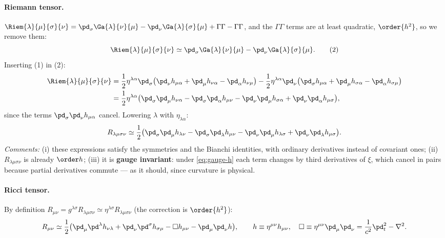 \paragraph{Riemann tensor.} $\Riem{\lambda}{\mu}{\sigma}{\nu}=\pd_\sigma\Ga{\lambda}{\nu}{\mu}-\pd_\nu\Ga{\lambda}{\sigma}{\mu}+\Gamma\Gamma-\Gamma\Gamma$, and the $\Gamma\Gamma$ terms are at least quadratic, $\order{h^2}$, so we remove them:
\begin{equation}
  \Riem{\lambda}{\mu}{\sigma}{\nu}\simeq\pd_\sigma\Ga{\lambda}{\nu}{\mu}-\pd_\nu\Ga{\lambda}{\sigma}{\mu}.\tag{2}
\end{equation}
Inserting (1) in (2):
\begin{align*}
  \Riem{\lambda}{\mu}{\sigma}{\nu}&=\frac12\eta^{\lambda\alpha}\pd_\sigma\big(\pd_\nu h_{\mu\alpha}+\pd_\mu h_{\nu\alpha}-\pd_\alpha h_{\nu\mu}\big)-\frac12\eta^{\lambda\alpha}\pd_\nu\big(\pd_\sigma h_{\mu\alpha}+\pd_\mu h_{\sigma\alpha}-\pd_\alpha h_{\sigma\mu}\big)\\
  &=\frac12\eta^{\lambda\alpha}\big(\pd_\sigma\pd_\mu h_{\nu\alpha}-\pd_\sigma\pd_\alpha h_{\mu\nu}-\pd_\nu\pd_\mu h_{\sigma\alpha}+\pd_\nu\pd_\alpha h_{\mu\sigma}\big),
\end{align*}
since the terms $\pd_\sigma\pd_\nu h_{\mu\alpha}$ cancel. Lowering $\lambda$ with $\eta_{\lambda\alpha}$:
\begin{equation}
  R_{\lambda\mu\sigma\nu}\simeq\frac12\big(\pd_\sigma\pd_\mu h_{\lambda\nu}-\pd_\sigma\pd_\lambda h_{\mu\nu}-\pd_\nu\pd_\mu h_{\lambda\sigma}+\pd_\nu\pd_\lambda h_{\mu\sigma}\big).
\end{equation}
\textit{Comments:} (i) these expressions satisfy the symmetries and the Bianchi identities, with ordinary derivatives instead of covariant ones; (ii) $R_{\lambda\mu\sigma\nu}$ is already $\order h$; (iii) it is \textbf{gauge invariant}: under \eqref{eq:gauge-h} each term changes by third derivatives of $\xi$, which cancel in pairs because partial derivatives commute --- as it should, since curvature is physical.

\paragraph{Ricci tensor.} By definition $R_{\mu\nu}=g^{\lambda\sigma}R_{\lambda\mu\sigma\nu}\simeq\eta^{\lambda\sigma}R_{\lambda\mu\sigma\nu}$ (the correction is $\order{h^2}$):
\begin{equation}
  R_{\mu\nu}\simeq\frac12\big(\pd_\mu\pd^\lambda h_{\nu\lambda}+\pd_\nu\pd^\sigma h_{\sigma\mu}-\Box h_{\mu\nu}-\pd_\mu\pd_\nu h\big),
  \qquad h\equiv\eta^{\mu\nu}h_{\mu\nu},\quad\Box\equiv\eta^{\mu\nu}\pd_\mu\pd_\nu=\frac{1}{c^2}\pd_t^2-\nabla^2 .
\end{equation}
